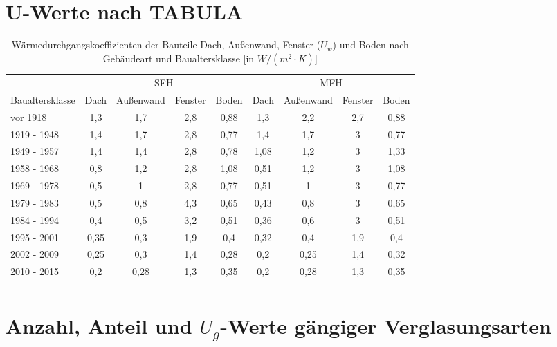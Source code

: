 \section{U-Werte nach TABULA}

\begin{table}[H]\centering
\begin{tabular}{lcccc|cccc}
\toprule[1.5pt]
 & \multicolumn{4}{c}{SFH}& \multicolumn{4}{c}{MFH}  \\ 
\cmidrule[1.5pt]{2-9}
Baualtersklasse & Dach & Außenwand & Fenster & Boden & Dach & Außenwand & Fenster & Boden \\ \addlinespace[5pt]
\midrule[2pt]
vor 1918 & 1,3 & 1,7 & 2,8 & 0,88 & 1,3 & 2,2 & 2,7 & 0,88 \\
\midrule
1919 - 1948 & 1,4 & 1,7 & 2,8 & 0,77 & 1,4 & 1,7 & 3 & 0,77 \\
\midrule
1949 - 1957 & 1,4 & 1,4 & 2,8 & 0,78 & 1,08 & 1,2 & 3 & 1,33 \\
\midrule
1958 - 1968 & 0,8 & 1,2 & 2,8 & 1,08 & 0,51 & 1,2 & 3 & 1,08 \\
\midrule
1969 - 1978 & 0,5 & 1 & 2,8 & 0,77 & 0,51 & 1 & 3 & 0,77 \\
\midrule
1979 - 1983 & 0,5 & 0,8 & 4,3 & 0,65 & 0,43 & 0,8 & 3 & 0,65 \\
\midrule
1984 - 1994 & 0,4 & 0,5 & 3,2 & 0,51 & 0,36 & 0,6 & 3 & 0,51 \\
\midrule
1995 - 2001 & 0,35 & 0,3 & 1,9 & 0,4 & 0,32 & 0,4 & 1,9 & 0,4 \\
\midrule
2002 - 2009 & 0,25 & 0,3 & 1,4 & 0,28 & 0,2 & 0,25 & 1,4 & 0,32 \\
\midrule
2010 - 2015 & 0,2 & 0,28 & 1,3 & 0,35 & 0,2 & 0,28 & 1,3 & 0,35 \\
\bottomrule[1.5pt] \addlinespace[10pt]
\end{tabular}
\caption{Wärmedurchgangskoeffizienten der Bauteile Dach, Außenwand, Fenster (\(U_w\)) und Boden nach Gebäudeart und Baualtersklasse [in \(W/(m^2 \cdot K)\)]}
\label{tab: TabelleA1}
\end{table}

\section{Anzahl, Anteil und \(U_g\)-Werte gängiger Verglasungsarten}

